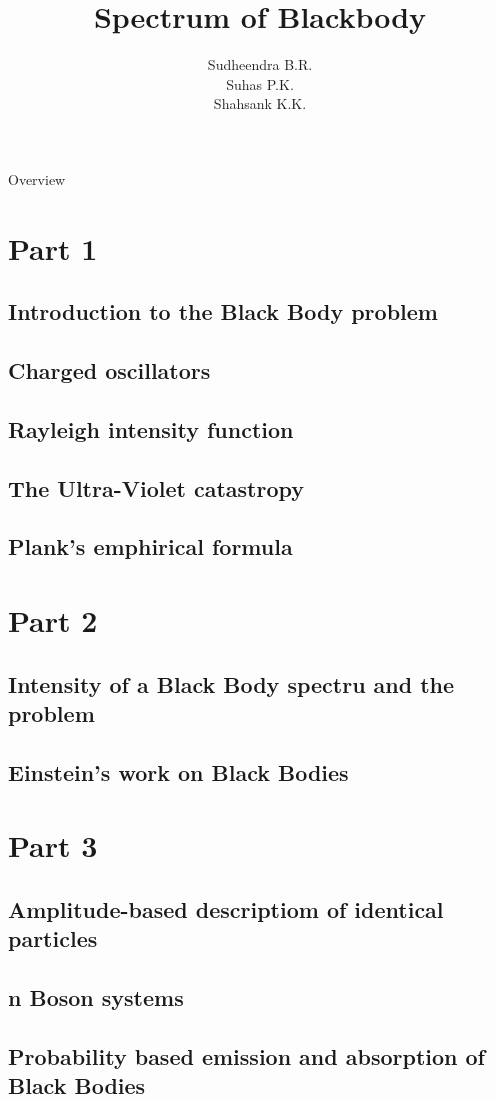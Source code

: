 \documentclass[aspectratio=169]{beamer}
\title{Spectrum of Blackbody}
\institute{Yuvaraja's College, Mysuru}
\author{Sudheendra B.R. \\ Suhas P.K. \\ Shahsank K.K.}
\date{}
\begin{document}
\begin{frame}[noframenumbering]
\titlepage
\end{frame}

\begin{frame}[noframenumbering]{Overview}
\tableofcontents
\end{frame}

\section{Part 1}
\subsection{Introduction to the Black Body problem} 
 
\subsection{Charged oscillators}
 
\subsection{Rayleigh intensity function}
 
\subsection{The Ultra-Violet catastropy} 

\subsection{Plank's emphirical formula}

\section{Part 2}
\subsection{Intensity of a Black Body spectru and the problem}

\subsection{Einstein's work on Black Bodies}

\section{Part 3}
\subsection{Amplitude-based descriptiom of identical particles}

\subsection{n Boson systems}

\subsection{Probability based emission and absorption of Black Bodies}
\end{document}
